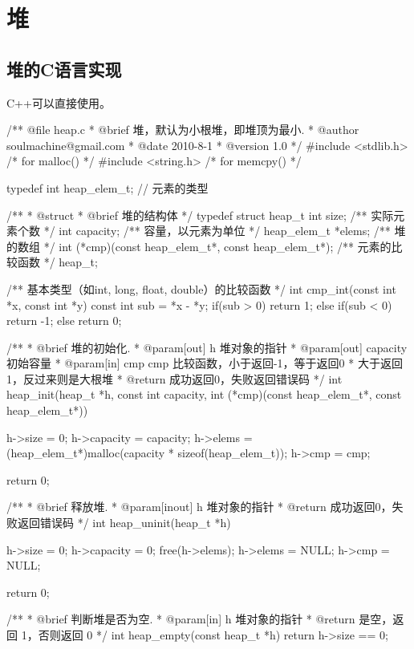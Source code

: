 \section{堆} %

\subsection{堆的C语言实现}
C++可以直接使用。

\begin{Codex}[label=heap.c]
/** @file heap.c
 * @brief 堆，默认为小根堆，即堆顶为最小.
 * @author soulmachine@gmail.com
 * @date 2010-8-1
 * @version 1.0
 */
#include <stdlib.h>  /* for malloc() */
#include <string.h>  /* for memcpy() */

typedef int heap_elem_t; // 元素的类型

/**
 * @struct
 * @brief 堆的结构体
 */
typedef struct heap_t {
    int     size;   /** 实际元素个数 */
    int     capacity; /** 容量，以元素为单位 */
    heap_elem_t  *elems;   /** 堆的数组 */
    int (*cmp)(const heap_elem_t*, const heap_elem_t*);   /** 元素的比较函数 */
}heap_t;


/** 基本类型（如int, long, float, double）的比较函数 */
int cmp_int(const int *x, const int *y) {
    const int sub = *x - *y;
    if(sub > 0) {
        return 1;
    } else if(sub < 0) {
        return -1;
    } else {
        return 0;
    }
}

/** 
 * @brief 堆的初始化.
 * @param[out] h 堆对象的指针
 * @param[out] capacity 初始容量
 * @param[in] cmp cmp 比较函数，小于返回-1，等于返回0
 * 大于返回1，反过来则是大根堆
 * @return 成功返回0，失败返回错误码
 */
int heap_init(heap_t *h, const int capacity, 
              int (*cmp)(const heap_elem_t*, const heap_elem_t*)) {
    h->size = 0;
    h->capacity = capacity;
    h->elems = (heap_elem_t*)malloc(capacity * sizeof(heap_elem_t));
    h->cmp = cmp;
    
    return 0;
}

/** 
 * @brief 释放堆.
 * @param[inout] h 堆对象的指针
 * @return 成功返回0，失败返回错误码
 */
int heap_uninit(heap_t *h) {
    h->size = 0;
    h->capacity = 0;
    free(h->elems);
    h->elems = NULL;
    h->cmp = NULL;

    return 0;
}


/** 
 * @brief 判断堆是否为空.
 * @param[in] h 堆对象的指针
 * @return 是空，返回 1，否则返回 0
 */
int heap_empty(const heap_t *h) {
    return h->size == 0;
}


\end{Codex}
